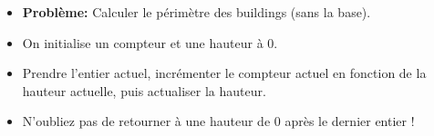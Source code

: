 
\begin{frame}
    \frametitle{\problemtitle}
    \begin{itemize}
        \item<+-> \textbf{Problème:} Calculer le périmètre des buildings (sans la base).
        \item<+-> On initialise un compteur et une hauteur à $0$.
        \item<+-> Prendre l'entier actuel, incrémenter le compteur actuel en fonction de la hauteur actuelle, puis actualiser la hauteur.
          \item<+-> N'oubliez pas de retourner à une hauteur de $0$ après le dernier entier !
    \end{itemize}
\end{frame}